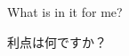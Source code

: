 \documentclass{beamer}
\begin{document}
\begin{frame}

\begin{center}
  \end{center}

\end{frame}
  
  \begin{frame}
   
   \begin{center}
   
   \LARGE{What is in it for me?}\\
   \LARGE{\begin{CJK}{UTF8}{min}利点は何ですか？\end{CJK}}
   
   
   \begin{center}
  \end{center}
   \end{center}

  \end{frame}
\end{document}
